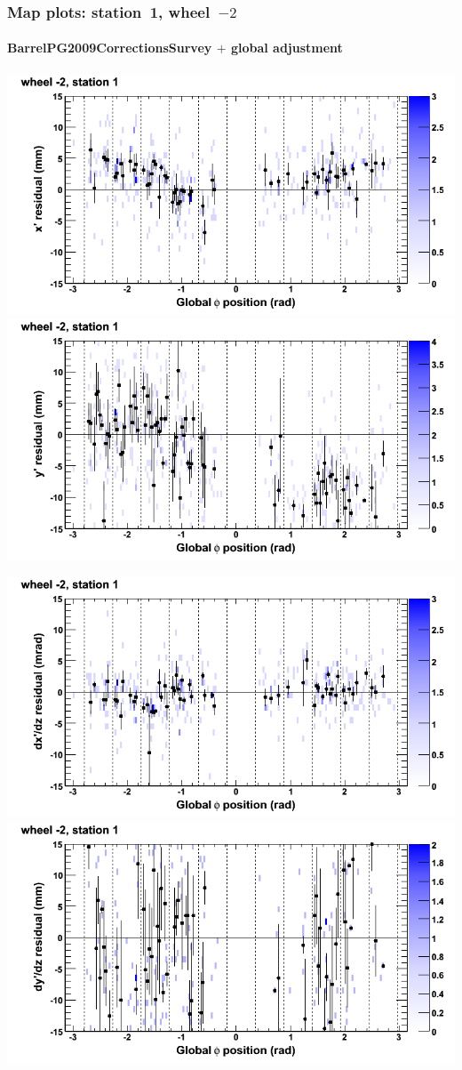 \documentclass[compress]{beamer}
\begin{document}
\begin{frame}
\frametitle{Map plots: station~1, wheel~$-2$}
\framesubtitle{BarrelPG2009CorrectionsSurvey $+$ global adjustment}
\includegraphics[width=0.5\linewidth]{mapplots_re01/DTvsphi_st1whA_x.png}
\includegraphics[width=0.5\linewidth]{mapplots_re01/DTvsphi_st1whA_y.png}

\includegraphics[width=0.5\linewidth]{mapplots_re01/DTvsphi_st1whA_dxdz.png}
\includegraphics[width=0.5\linewidth]{mapplots_re01/DTvsphi_st1whA_dydz.png}
\end{frame}
\end{document}
